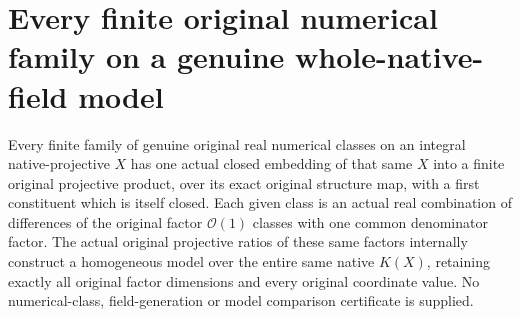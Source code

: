 \section{Every finite original numerical family on a genuine whole-native-field model}
\label{sec:native-numerical-whole-field-presentations}

\begin{theorem}
\label{thm:native-numerical-whole-field-presentations}
\leanok
{}
Every finite family of genuine original real numerical classes
on an integral native-projective $X$ has one actual closed
embedding of that same $X$ into a finite original projective
product, over its exact original structure map, with a first
constituent which is itself closed. Each given class is an
actual real combination of differences of the original
factor $\mathcal O(1)$ classes with one common denominator
factor. The actual original projective ratios of these same
factors internally construct a homogeneous model over the
entire same native $K(X)$, retaining exactly all original
factor dimensions and every original coordinate value.
No numerical-class, field-generation or model comparison
certificate is supplied.
\end{theorem}

